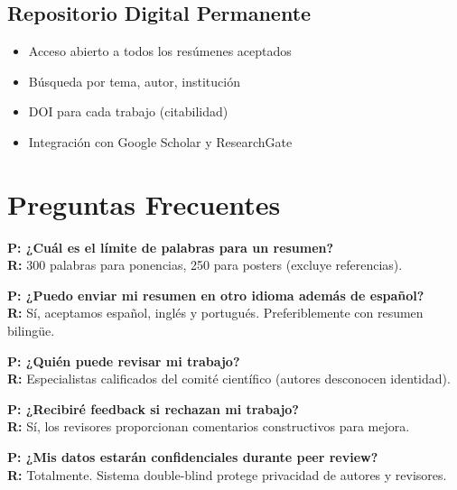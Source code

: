\documentclass[12pt,a4paper]{article}
\begin{document}
\subsection{Repositorio Digital Permanente}

\begin{itemize}[label={\textcolor{verdemid}{\checkmark}}]
  \item Acceso abierto a todos los resúmenes aceptados
  \item Búsqueda por tema, autor, institución
  \item DOI para cada trabajo (citabilidad)
  \item Integración con Google Scholar y ResearchGate
\end{itemize}

\section{Preguntas Frecuentes}

\begin{tcolorbox}[enhanced, colback=azulclaro, colframe=verdemid, boxrule=1.5pt, left=10pt, right=10pt, top=10pt, bottom=10pt]

\noindent\textbf{P: ¿Cuál es el límite de palabras para un resumen?}\\
\textbf{R:} 300 palabras para ponencias, 250 para posters (excluye referencias).

\vspace{0.5cm}

\noindent\textbf{P: ¿Puedo enviar mi resumen en otro idioma además de español?}\\
\textbf{R:} Sí, aceptamos español, inglés y portugués. Preferiblemente con resumen bilingüe.

\vspace{0.5cm}

\noindent\textbf{P: ¿Quién puede revisar mi trabajo?}\\
\textbf{R:} Especialistas calificados del comité científico (autores desconocen identidad).

\vspace{0.5cm}

\noindent\textbf{P: ¿Recibiré feedback si rechazan mi trabajo?}\\
\textbf{R:} Sí, los revisores proporcionan comentarios constructivos para mejora.

\vspace{0.5cm}

\noindent\textbf{P: ¿Mis datos estarán confidenciales durante peer review?}\\
\textbf{R:} Totalmente. Sistema double-blind protege privacidad de autores y revisores.

\end{tcolorbox}
\end{document}
